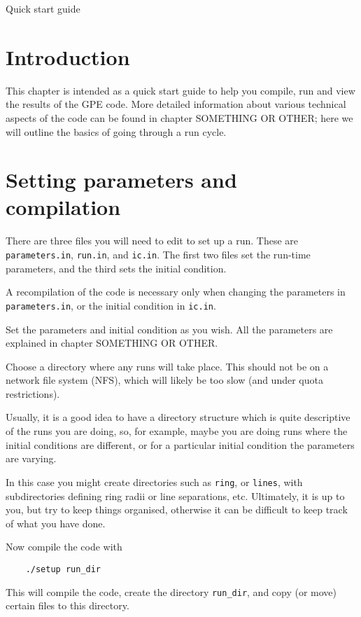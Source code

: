 
\begin{chapter}{\label{cha:quickstart} Quick start guide}
  \section{Introduction}
  This chapter is intended as a quick start guide to help you compile, run and
  view the results of the GPE code.  More detailed information about various
  technical aspects of the code can be found in chapter SOMETHING OR OTHER;
  here we will outline the basics of going through a run cycle.

  \section{Setting parameters and compilation}
  There are three files you will need to edit to set up a run.  These are
  \verb"parameters.in", \verb"run.in", and \verb"ic.in".  The first two files
  set the run-time parameters, and the third sets the initial condition.

  A recompilation of the code is necessary only when changing the parameters in
  \verb"parameters.in", or the initial condition in \verb"ic.in".
  
  Set the parameters and initial condition as you wish.  All the
  parameters are explained in chapter SOMETHING OR OTHER.

  Choose a directory where any runs will take place.  This should not be on a
  network file system (NFS), which will likely be too slow (and under quota
  restrictions).

  Usually, it is a good idea to have a directory structure which is quite
  descriptive of the runs you are doing, so, for example, maybe you are doing
  runs where the initial conditions are different, or for a particular initial
  condition the parameters are varying.

  In this case you might create directories such as \verb"ring", or
  \verb"lines", with subdirectories defining ring radii or line separations,
  etc.  Ultimately, it is up to you, but try to keep things organised,
  otherwise it can be difficult to keep track of what you have done.

  Now compile the code with
  \begin{Verbatim}
    ./setup run_dir
  \end{Verbatim}
  This will compile the code, create the directory \verb"run_dir", and copy (or
  move) certain files to this directory.


\end{chapter}
